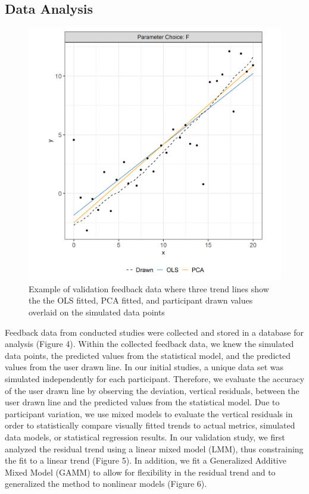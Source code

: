 \documentclass[
  letterpaper,
  DIV=11,
  numbers=noendperiod]{scrartcl}
\begin{document}
\hypertarget{data-analysis}{%
\subsection{Data Analysis}\label{data-analysis}}

\begin{figure}[ht]
\begin{center}
\centerline{\includegraphics[width=\columnwidth]{images/eyefitting-trial-plot}}
\caption{Example of validation feedback data where three trend lines show the the OLS fitted, PCA fitted, and participant drawn values overlaid on the simulated data points}
\label{eyefitting-trial-plot}
\end{center}
\end{figure}

Feedback data from conducted studies were collected and stored in a
database for analysis (Figure 4). Within the collected feedback data, we
knew the simulated data points, the predicted values from the
statistical model, and the predicted values from the user drawn line. In
our initial studies, a unique data set was simulated independently for
each participant. Therefore, we evaluate the accuracy of the user drawn
line by observing the deviation, vertical residuals, between the user
drawn line and the predicted values from the statistical model. Due to
participant variation, we use mixed models to evaluate the vertical
residuals in order to statistically compare visually fitted trends to
actual metrics, simulated data models, or statistical regression
results. In our validation study, we first analyzed the residual trend
using a linear mixed model (LMM), thus constraining the fit to a linear
trend (Figure 5). In addition, we fit a Generalized Additive Mixed Model
(GAMM) to allow for flexibility in the residual trend and to generalized
the method to nonlinear models (Figure 6).
\end{document}
